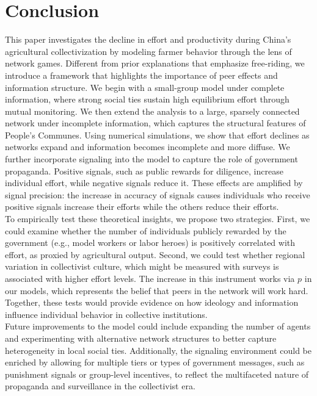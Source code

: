 \documentclass[12pt]{article}
\begin{document}
\section{Conclusion}
This paper investigates the decline in effort and productivity during China's agricultural collectivization by modeling farmer behavior through the lens of network games. Different from prior explanations that emphasize free-riding, we introduce a framework that highlights the importance of peer effects and information structure. We begin with a small-group model under complete information, where strong social ties sustain high equilibrium effort through mutual monitoring. We then extend the analysis to a large, sparsely connected network under incomplete information, which captures the structural features of People's Communes. Using numerical simulations, we show that effort declines as networks expand and information becomes incomplete and more diffuse. We further incorporate signaling into the model to capture the role of government propaganda. Positive signals, such as public rewards for diligence, increase individual effort, while negative signals reduce it. These effects are amplified by signal precision: the increase in accuracy of signals causes individuals who receive positive signals increase their efforts while the others reduce their efforts.\\
To empirically test these theoretical insights, we propose two strategies. First, we could examine whether the number of individuals publicly rewarded by the government (e.g., model workers or labor heroes) is positively correlated with effort, as proxied by agricultural output. Second, we could test whether regional variation in collectivist culture, which might be measured with surveys is associated with higher effort levels. The increase in this instrument works via $p$ in our models, which represents the belief that peers in the network will work hard. Together, these tests would provide evidence on how ideology and information influence individual behavior in collective institutions.\\
Future improvements to the model could include expanding the number of agents and experimenting with alternative network structures to better capture heterogeneity in local social ties. Additionally, the signaling environment could be enriched by allowing for multiple tiers or types of government messages, such as punishment signals or group-level incentives, to reflect the multifaceted nature of propaganda and surveillance in the collectivist era.
  
\end{document}

